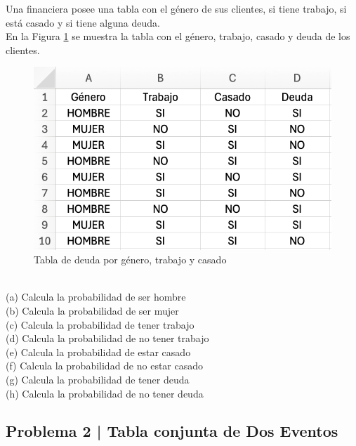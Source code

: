 \documentclass{article}
\begin{document}
Una financiera posee una tabla con el género de sus clientes, si tiene trabajo, si está casado y si tiene alguna deuda.
\\[12pt]
En la Figura \ref{fig:p201} se muestra la tabla con el género, trabajo, casado y deuda de los clientes.
\begin{figure}[!ht]
    \centering
    \begin{minipage}{\textwidth}
        \centering
        \includegraphics[width=\textwidth]{figures/p201.png}
    \end{minipage}
    \captionsetup{width=0.9\textwidth}
    \caption{Tabla de deuda por género, trabajo y casado}
    \label{fig:p201}
\end{figure}
\\
(a) Calcula la probabilidad de ser hombre
\\[6pt]
(b) Calcula la probabilidad de ser mujer
\\[6pt]
(c) Calcula la probabilidad de tener trabajo
\\[6pt]
(d) Calcula la probabilidad de no tener trabajo
\\[6pt]
(e) Calcula la probabilidad de estar casado
\\[6pt]
(f) Calcula la probabilidad de no estar casado
\\[6pt]
(g) Calcula la probabilidad de tener deuda
\\[6pt]
(h) Calcula la probabilidad de no tener deuda

\clearpage

\subsection*{Problema 2 | Tabla conjunta de Dos Eventos}
\end{document}

